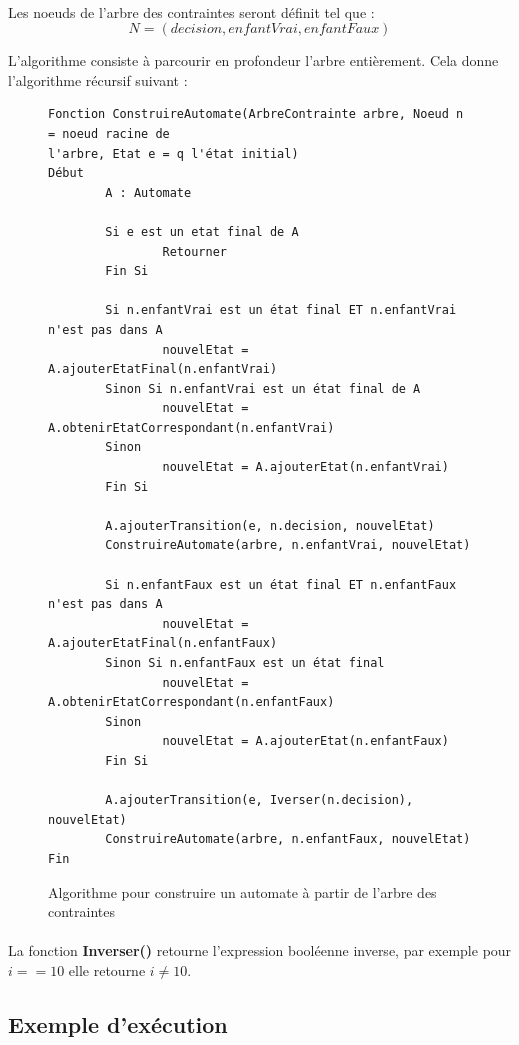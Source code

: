 \paragraph{}
Les noeuds de l'arbre des contraintes seront définit tel que :
$$ N = (decision, enfantVrai, enfantFaux)$$


L'algorithme consiste à parcourir en profondeur l'arbre entièrement.
Cela donne l'algorithme récursif suivant :

\begin{figure}
\centering
\begin{verbatim}
Fonction ConstruireAutomate(ArbreContrainte arbre, Noeud n = noeud racine de 
l'arbre, Etat e = q l'état initial)
Début
        A : Automate
	
        Si e est un etat final de A
                Retourner 
        Fin Si
        
        Si n.enfantVrai est un état final ET n.enfantVrai n'est pas dans A
                nouvelEtat = A.ajouterEtatFinal(n.enfantVrai)
        Sinon Si n.enfantVrai est un état final de A
                nouvelEtat = A.obtenirEtatCorrespondant(n.enfantVrai)
        Sinon
                nouvelEtat = A.ajouterEtat(n.enfantVrai)
        Fin Si
	
        A.ajouterTransition(e, n.decision, nouvelEtat)
        ConstruireAutomate(arbre, n.enfantVrai, nouvelEtat)

        Si n.enfantFaux est un état final ET n.enfantFaux n'est pas dans A
                nouvelEtat = A.ajouterEtatFinal(n.enfantFaux)
        Sinon Si n.enfantFaux est un état final
                nouvelEtat = A.obtenirEtatCorrespondant(n.enfantFaux)
        Sinon
                nouvelEtat = A.ajouterEtat(n.enfantFaux)
        Fin Si
	
        A.ajouterTransition(e, Iverser(n.decision), nouvelEtat)
        ConstruireAutomate(arbre, n.enfantFaux, nouvelEtat)
Fin
\end{verbatim}
\caption{Algorithme pour construire un automate à partir de l'arbre des 
contraintes}
\end{figure}

\paragraph{}
La fonction \textbf{Inverser()} retourne l'expression booléenne inverse, par 
exemple pour $i == 10$ elle retourne $i \ne 10$. 

\subsection{Exemple d'exécution}


